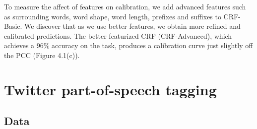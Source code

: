To measure the affect of features on calibration, we add advanced features such as surrounding words, word shape, word length, prefixes and suffixes to CRF-Basic. We discover that as we use better features, we obtain more refined and calibrated predictions. The better featurized CRF (CRF-Advanced), which achieves a 96\% accuracy on the task, produces a calibration curve just slightly off the PCC (Figure 4.1(c)). 

\section{Twitter part-of-speech tagging}
\subsection{Data}

